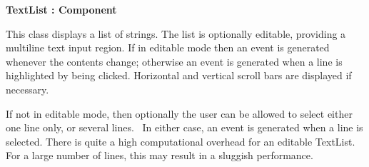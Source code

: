 
{\ttfamily\bfseries
{}TextList : Component}

This class displays a list of strings. The list is optionally editable,
providing a multiline text input region. If in editable mode then an
event is generated whenever the contents change; otherwise an event is
generated when a line is highlighted by being clicked. Horizontal and
vertical scroll bars are displayed if necessary.

If not in editable mode, then optionally the user can be allowed to
select either one line only, or several lines. \ In either case, an
event is generated when a line is selected. There is quite a high
computational overhead for an editable TextList. For a large number of
lines, this may result in a sluggish performance.

